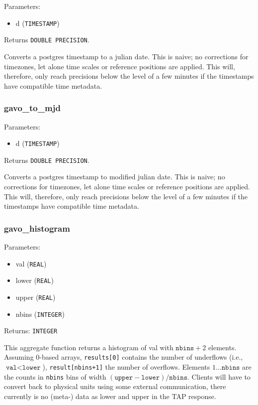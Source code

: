 \documentclass[11pt,a4paper]{ivoa}
\begin{document}
Parameters:

\begin{itemize}
	\item d (\texttt{TIMESTAMP})
\end{itemize}

Returns \texttt{DOUBLE PRECISION}.

Converts a postgres timestamp to a julian date. This is naive;
no corrections for timezones, let alone time scales or reference
positions are applied.  This will, therefore, only reach precisions
below the level of a few minutes if the timestamps have compatible time
metadata.

\subsubsection{gavo\_to\_mjd}

Parameters:

\begin{itemize}
	\item d (\texttt{TIMESTAMP})
\end{itemize}

Returns \texttt{DOUBLE PRECISION}.

Converts a postgres timestamp to modified julian date. This is naive; 
no corrections for timezones, let alone time scales or reference
positions are applied.  This will, therefore, only reach precisions
below the level of a few minutes if the timestamps have compatible time
metadata.

\subsubsection{gavo\_histogram}

Parameters:

\begin{itemize}
	\item val (\texttt{REAL})
	\item lower (\texttt{REAL})
	\item upper (\texttt{REAL})
	\item nbins (\texttt{INTEGER})
\end{itemize}

Returns: \texttt{INTEGER\[\]}

This aggregate function returns a histogram of val with
$\texttt{nbins}+2$ elements.  Assuming 0-based arrays, \verb|results[0]|
contains the number of underflows (i.e., $\texttt{val}<\texttt{lower}$),
\verb|result[nbins+1]| the number of overflows. Elements
$1\ldots\texttt{nbins}$ are the counts in \texttt{nbins} bins of width
$(\texttt{upper}-\texttt{lower})/\texttt{nbins}$.  Clients will have to
convert back to physical units using some external communication, there
currently is no (meta-) data as lower and upper in the TAP response.
\end{document}
